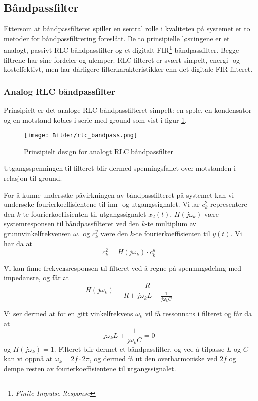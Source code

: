 \subsection{Båndpassfilter}
Ettersom at båndpassfilteret spiller en sentral rolle i kvaliteten på systemet er to metoder for 
båndpassfiltrering foreslått. De to prinsipielle løsningene er et analogt, passivt RLC båndpassfilter og et digitalt 
FIR\footnote{\textit{Finite Impulse Response}} båndpassfilter. Begge filtrene har sine fordeler og ulemper. RLC filteret 
er svært simpelt, energi- og kosteffektivt, men har dårligere filterkarakteristikker enn det digitale FIR filteret.

\subsubsection{Analog RLC båndpassfilter}
Prinsipielt er det analoge RLC båndpassfilteret simpelt: en spole, en kondensator og en motstand kobles i serie med ground
som vist i figur \ref{fig:rlc_idea}.

\begin{figure}[H]
    \centering
    \texttt{[image: Bilder/rlc\_bandpass.png]}
    \caption{Prinsipielt design for analogt RLC båndpassfilter}
    \label{fig:rlc_idea}
\end{figure}

Utgangsspenningen til filteret blir dermed spenningsfallet over 
motstanden i relasjon til ground. 

For å kunne undersøke påvirkningen av båndpassfilteret på systemet kan 
vi undersøke fourierkoeffisientene til inn- og utgangssignalet.
Vi lar $c_k^2$ representere den $k$-te fourierkoeffisienten til 
utgangssignalet $x_2(t)$, $H(j\omega_k)$ være 
systemresponsen til båndpassfilteret ved den $k$-te multiplum av grunnvinkelfrekvensen
$\omega_1$ og $c_k^y$ være den $k$-te fourierkoeffisienten til $y(t)$. Vi har da at
\begin{equation}
    \label{eq:bandpass_fourier_coeff}
    c_k^2 = H(j\omega_k) \cdot c_k^y
\end{equation}

Vi kan finne frekvensresponsen til filteret ved å regne på spenningsdeling med impedansre, og får at 
\[
    H(j\omega_k) = \frac{R}{R + j\omega_k L + \frac{1}{j\omega_k C}}
\]

Vi ser dermed at for en gitt vinkelfrekvens $\omega_k$ vil få ressonnans i filteret og får da at
\[
    j\omega_k L + \frac{1}{j\omega_k C} = 0
\]
og $H(j\omega_k) = 1$. Filteret blir dermet et båndpassfilter, og ved å tilpasse $L$ og $C$ kan vi oppnå 
at $\omega_k = 2f \cdot 2\pi$, og dermed få ut den overharmoniske ved $2f$ og dempe resten av fourierkoeffisientene til 
utgangssignalet.

